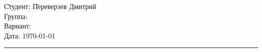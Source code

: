 \begin{tabbing}
	\hspace{11cm} \= Студент: \= Переверзев Дмитрий \\
	\> Группа:  \\
	\> Вариант:  \\
	\> Дата: \> \today
\end{tabbing}
\hrule
\vspace{1cm}